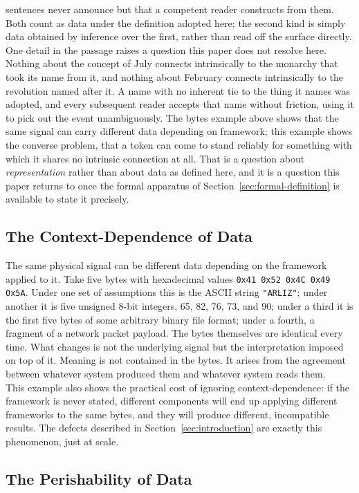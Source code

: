 sentences never announce but that a competent reader constructs from them.
Both count as data under the definition adopted here; the second kind is
simply data obtained by inference over the first, rather than read off the
surface directly.\newpage
One detail in the passage raises a question this paper does not resolve here.
Nothing about the concept of July connects intrinsically to the monarchy that
took its name from it, and nothing about February connects intrinsically to
the revolution named after it. A name with no inherent tie to the thing it
names was adopted, and every subsequent reader accepts that name without
friction, using it to pick out the event unambiguously. The bytes example
above shows that the same signal can carry different data depending on
framework; this example shows the converse problem, that a token can come to
stand reliably for something with which it shares no intrinsic connection at
all. That is a question about \emph{representation} rather than about data as
defined here, and it is a question this paper returns to once the formal
apparatus of Section~\ref{sec:formal-definition} is available to state it
precisely.
\newpage
\subsection{The Context-Dependence of Data}

The same physical signal can be different data depending on the framework
applied to it. Take five bytes with hexadecimal values \texttt{0x41 0x52 0x4C
0x49 0x5A}. Under one set of assumptions this is the ASCII string
\texttt{"ARLIZ"}; under another it is five unsigned 8-bit integers, 65, 82, 76,
73, and 90; under a third it is the first five bytes of some arbitrary binary
file format; under a fourth, a fragment of a network packet payload. The bytes
themselves are identical every time. What changes is not the underlying
signal but the interpretation imposed on top of it. Meaning is not contained in
the bytes. It arises from the agreement between whatever system produced them
and whatever system reads them.\\
This example also shows the practical cost of ignoring context-dependence: if
the framework is never stated, different components will end up applying
different frameworks to the same bytes, and they will produce different,
incompatible results. The defects described in
Section~\ref{sec:introduction} are exactly this phenomenon, just at scale.

\subsection{The Perishability of Data}

